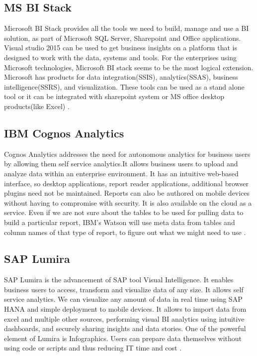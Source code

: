 \subsection*{MS BI Stack}

Microsoft BI Stack provides all the tools we need to build, manage and use a BI solution, as part of Microsoft SQL Server, Sharepoint and Office applications. Visual studio 2015 can be used to get business insights on a platform that is designed to work with the data, systems and tools. For the enterprises using Microsoft technologies, Microsoft BI stack seems to be the most logical extension. Microsoft has products for data integration(SSIS), analytics(SSAS), business intelligence(SSRS), and visualization. These tools can be used as a stand alone tool or it can be integrated with sharepoint system or MS office desktop products(like Excel) \cite{MS}.

\subsection*{IBM Cognos Analytics }

Cognos Analytics addresses the need for autonomous analytics for business users by allowing them self service analytics.It allows business users to upload and analyze data within an enterprise environment. It has an intuitive web-based interface, so desktop applications, report reader applications, additional browser plugins need not be maintained. Reports can also be authored on mobile devices without having to compromise with security. It is also available on the cloud as a service. Even if we are not sure about the tables to be used for pulling data to build a particular report, IBM's Watson will use meta data from tables and column names of that type of report, to figure out what we might need to use \cite{cognos}. 

\subsection*{SAP Lumira}

SAP Lumira is the advancement of SAP tool Visual Intelligence. It enables business users to access, transform and visualize data of any size. It allows self service analytics. We can visualize any amount of data in real time using SAP HANA and simple deployment to mobile devices. It allows to import data from excel and multiple other sources, performing visual BI analytics using intuitive dashboards, and securely sharing insights and data stories. One of the powerful element of Lumira is Infographics. Users can prepare data themselves without using code or scripts and thus reducing IT time and cost \cite{SAP}.



